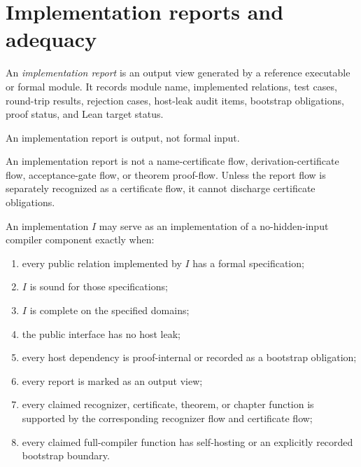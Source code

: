 \section{Implementation reports and adequacy}
\label{sec:implementation-interface-reports-adequacy}

\begin{definition}
\label{def:implementation-interface-implementation-report}
An \emph{implementation report} is an output view generated by a reference executable or formal module. It records module name, implemented relations, test cases, round-trip results, rejection cases, host-leak audit items, bootstrap obligations, proof status, and Lean target status.

An implementation report is output, not formal input.
\end{definition}

\begin{principle}
\label{prin:implementation-interface-reports-not-certificates}
An implementation report is not a name-certificate flow, derivation-certificate flow, acceptance-gate flow, or theorem proof-flow. Unless the report flow is separately recognized as a certificate flow, it cannot discharge certificate obligations.
\end{principle}

\begin{theorem}
\label{thm:implementation-interface-adequacy}
An implementation $I$ may serve as an implementation of a no-hidden-input compiler component exactly when:
\begin{enumerate}
\item every public relation implemented by $I$ has a formal specification;
\item $I$ is sound for those specifications;
\item $I$ is complete on the specified domains;
\item the public interface has no host leak;
\item every host dependency is proof-internal or recorded as a bootstrap obligation;
\item every report is marked as an output view;
\item every claimed recognizer, certificate, theorem, or chapter function is supported by the corresponding recognizer flow and certificate flow;
\item every claimed full-compiler function has self-hosting or an explicitly recorded bootstrap boundary.
\end{enumerate}
\end{theorem}

